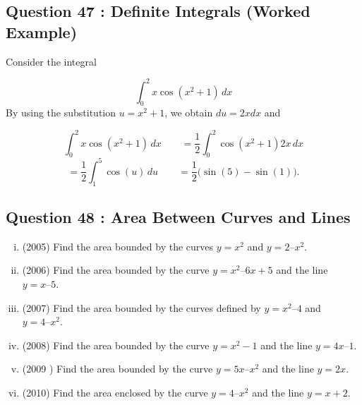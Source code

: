 \documentclass[]{article}
\begin{document}
\subsection*{Question 47 : Definite Integrals (Worked Example) }
\begin{framed}
	
	\noindent Consider the integral
	
	
	\[\int_{0}^2 x \cos(x^2+1) \,dx\]
	By using the substitution $u = x^2 + 1$, we obtain $du = 2x dx$ and
	
	\[	\int_{0}^2 x \cos(x^2+1) \,dx \qquad	= \frac{1}{2} \int_{0}^2 \cos(x^2+1) 2x \,dx \]
	\[	= \frac{1}{2} \int_{1}^{5}\cos(u)\,du  \qquad	= \frac{1}{2}\bigg(\sin(5)-\sin(1)\bigg).\]
\end{framed}
\bigskip

\newpage

\subsection*{Question 48 : Area Between Curves and Lines}
\begin{enumerate}[(i)]
	\item (2005) Find the area bounded by the curves $y = x^2$ and $y = 2 – x^2$. 
	
	\item (2006) Find the area bounded by the curve $y = x^2 – 6x + 5$ and the line $y = x – 5$.
	
	\item (2007) Find the area bounded by the curves defined by $y = x^2 – 4$ and $y = 4 – x^2$. 
	
	\item (2008) Find the area bounded by the curve $y = x^2- 1$ and the line $y = 4x – 1$.
	
	\item (2009 ) Find the area bounded by the curve $y = 5x –x^2$ and the line $y = 2x$.
	
	\item (2010) Find the area enclosed by the curve $y = 4 –x^2$ and the line $y = x +2$.
\end{enumerate}
\bigskip
\end{document}
